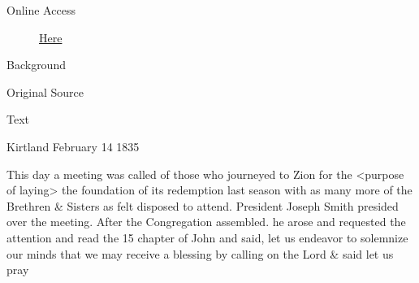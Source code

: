 				\begin{description}
					\item[Online Access] \href{https://www.josephsmithpapers.org/paper-summary/minutes-discourse-and-blessings-14-15-february-1835/1}{Here}
				\end{description}
				
				\begin{description}
					\item[Background]
				\end{description}
				
				
				\begin{description}
					\item[Original Source]
				\end{description}
				
				
				\begin{description}
					\item[Text]
				\end{description}
				

					Kirtland February 14 1835

					This day a meeting was called of those who journeyed to Zion for the <purpose of laying> the foundation of its redemption last season with as many more of the Brethren \& Sisters as felt disposed to attend. President Joseph Smith  presided over the meeting. After the Congregation assembled. he arose and requested the attention and read the 15 chapter of John and said, let us endeavor to solemnize our minds that we may receive a blessing by calling on the Lord \& said let us pray

